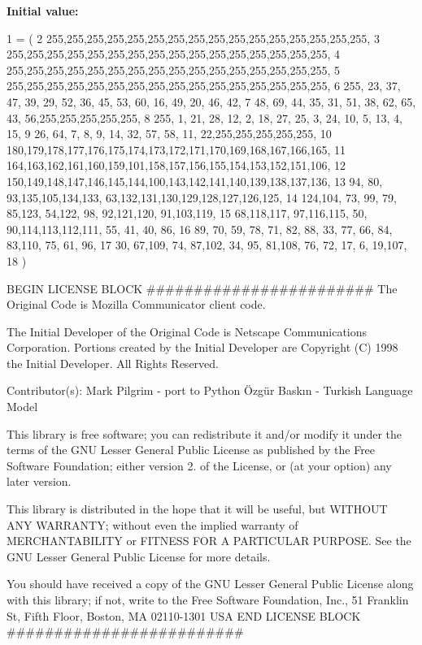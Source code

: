{\bfseries Initial value\+:}
\begin{DoxyCode}
1 =  (
2 255,255,255,255,255,255,255,255,255,255,255,255,255,255,255,255,
3 255,255,255,255,255,255,255,255,255,255,255,255,255,255,255,255,
4 255,255,255,255,255,255,255,255,255,255,255,255,255,255,255,255,
5 255,255,255,255,255,255,255,255,255,255,255,255,255,255,255,255,
6 255, 23, 37, 47, 39, 29, 52, 36, 45, 53, 60, 16, 49, 20, 46, 42,
7  48, 69, 44, 35, 31, 51, 38, 62, 65, 43, 56,255,255,255,255,255,
8 255,  1, 21, 28, 12,  2, 18, 27, 25,  3, 24, 10,  5, 13,  4, 15,
9  26, 64,  7,  8,  9, 14, 32, 57, 58, 11, 22,255,255,255,255,255,
10 180,179,178,177,176,175,174,173,172,171,170,169,168,167,166,165,
11 164,163,162,161,160,159,101,158,157,156,155,154,153,152,151,106,
12 150,149,148,147,146,145,144,100,143,142,141,140,139,138,137,136,
13  94, 80, 93,135,105,134,133, 63,132,131,130,129,128,127,126,125,
14 124,104, 73, 99, 79, 85,123, 54,122, 98, 92,121,120, 91,103,119,
15  68,118,117, 97,116,115, 50, 90,114,113,112,111, 55, 41, 40, 86,
16  89, 70, 59, 78, 71, 82, 88, 33, 77, 66, 84, 83,110, 75, 61, 96,
17  30, 67,109, 74, 87,102, 34, 95, 81,108, 76, 72, 17,  6, 19,107,
18 )
\end{DoxyCode}


B\+E\+G\+IN L\+I\+C\+E\+N\+SE B\+L\+O\+CK \#\#\#\#\#\#\#\#\#\#\#\#\#\#\#\#\#\#\#\#\#\#\#\# The Original Code is Mozilla Communicator client code. 

The Initial Developer of the Original Code is Netscape Communications Corporation. Portions created by the Initial Developer are Copyright (C) 1998 the Initial Developer. All Rights Reserved.

Contributor(s)\+: Mark Pilgrim -\/ port to Python Özgür Baskın -\/ Turkish Language Model

This library is free software; you can redistribute it and/or modify it under the terms of the G\+NU Lesser General Public License as published by the Free Software Foundation; either version 2. of the License, or (at your option) any later version.

This library is distributed in the hope that it will be useful, but W\+I\+T\+H\+O\+UT A\+NY W\+A\+R\+R\+A\+N\+TY; without even the implied warranty of M\+E\+R\+C\+H\+A\+N\+T\+A\+B\+I\+L\+I\+TY or F\+I\+T\+N\+E\+SS F\+OR A P\+A\+R\+T\+I\+C\+U\+L\+AR P\+U\+R\+P\+O\+SE. See the G\+NU Lesser General Public License for more details.

You should have received a copy of the G\+NU Lesser General Public License along with this library; if not, write to the Free Software Foundation, Inc., 51 Franklin St, Fifth Floor, Boston, MA 02110-\/1301 U\+SA E\+ND L\+I\+C\+E\+N\+SE B\+L\+O\+CK \#\#\#\#\#\#\#\#\#\#\#\#\#\#\#\#\#\#\#\#\#\#\#\#\# \mbox{\label{namespacechardet_1_1langturkishmodel_af7bda724757aa06e712222106cbdf270}} 

